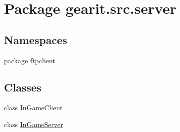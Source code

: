\hypertarget{namespacegearit_1_1src_1_1server}{\section{Package gearit.\+src.\+server}
\label{namespacegearit_1_1src_1_1server}
}
\subsection*{Namespaces}
\begin{DoxyCompactItemize}
\item 
package \hyperlink{namespacegearit_1_1src_1_1server_1_1ftpclient}{ftpclient}
\end{DoxyCompactItemize}
\subsection*{Classes}
\begin{DoxyCompactItemize}
\item 
class \hyperlink{classgearit_1_1src_1_1server_1_1_in_game_client}{In\+Game\+Client}
\item 
class \hyperlink{classgearit_1_1src_1_1server_1_1_in_game_server}{In\+Game\+Server}
\end{DoxyCompactItemize}
